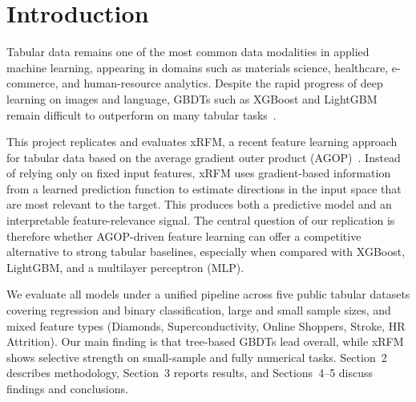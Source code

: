 
\section{Introduction}

Tabular data remains one of the most common data modalities in applied machine learning, appearing in domains such as materials science, healthcare, e-commerce, and human-resource analytics. Despite the rapid progress of deep learning on images and language, GBDTs such as XGBoost and LightGBM remain difficult to outperform on many tabular tasks~\citep{grinsztajn2022tree,holzmuller2024better}.

This project replicates and evaluates xRFM, a recent feature learning approach for tabular data based on the average gradient outer product (AGOP)~\citep{beaglehole2025xrfm,radhakrishnan2024mechanism}. Instead of relying only on fixed input features, xRFM uses gradient-based information from a learned prediction function to estimate directions in the input space that are most relevant to the target. This produces both a predictive model and an interpretable feature-relevance signal. The central question of our replication is therefore whether AGOP-driven feature learning can offer a competitive alternative to strong tabular baselines, especially when compared with XGBoost, LightGBM, and a multilayer perceptron (MLP).

We evaluate all models under a unified pipeline across five public tabular datasets covering regression and binary classification, large and small sample sizes, and mixed feature types (Diamonds, Superconductivity, Online Shoppers, Stroke, HR Attrition). Our main finding is that tree-based GBDTs lead overall, while xRFM shows selective strength on small-sample and fully numerical tasks. Section~2 describes methodology, Section~3 reports results, and Sections~4--5 discuss findings and conclusions.
